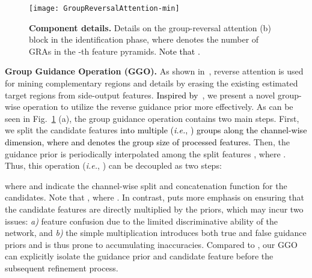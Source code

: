 \documentclass[10pt,journal,compsoc]{IEEEtran}
\def\ie{\emph{i.e.}}
\newcommand{\myPara}[1]{\vspace{6pt}\noindent\textbf{#1}\qquad }
\newcommand{\figref}[1]{Fig.~\ref{#1}}
\newcommand{\Rev}[1]{\textcolor{black}{#1}}
\begin{document}
\begin{figure}[t!]
  \centering
  \texttt{[image: GroupReversalAttention-min]}\\
  \vspace{-10pt}
  \caption{\textbf{Component details.}
    Details on the group-reversal attention (b) block  
    in the identification phase, 
    where  denotes the number of GRAs in the -th feature pyramids. \Rev{Note that .}
  }\label{fig:GRA}
\end{figure}

\myPara{Group Guidance Operation (GGO).}
As shown in~\cite{fan2020pranet}, 
reverse attention is used for mining complementary regions and details 
by erasing the existing estimated target regions from side-output features.
\Rev{Inspired by~\cite{chen2020progressively}}, we present a novel group-wise operation to utilize 
the reverse guidance prior more effectively.
As can be seen in \figref{fig:GRA} (a), 
the group guidance operation contains two main steps. 
First, we split the candidate features \Rev{ into multiple (\ie, ) groups along the channel-wise dimension, where  and  denotes the group size of processed features.}
Then, the guidance prior  is periodically interpolated among the 
split features , 
where .
Thus, this operation (\ie, ) 
can be decoupled as two steps:

where  and  indicate the channel-wise split 
and concatenation function for the candidates.
Note that , 
where .
In contrast, \cite{fan2020pranet} puts more emphasis on ensuring that the 
candidate features are directly multiplied by the priors, 
which may incur two issues:
\textit{a)} feature confusion due to the limited discriminative ability of 
the network, and 
\textit{b)} the simple multiplication introduces both true and false guidance 
priors and is thus prone to accumulating inaccuracies.
Compared to \cite{fan2020pranet}, our GGO can explicitly isolate the guidance 
prior and candidate feature before the subsequent refinement process.
\end{document}
